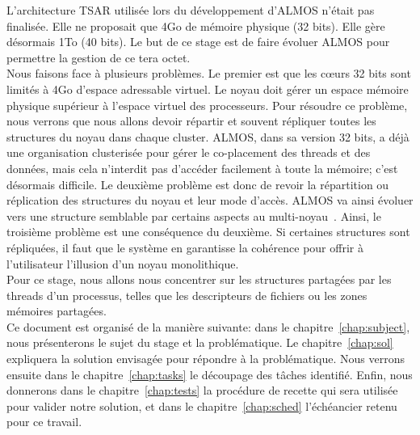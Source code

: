   \hspace{1cm}L'architecture TSAR utilisée lors du développement d'ALMOS n'était
  pas finalisée. Elle ne proposait que 4Go de mémoire physique (32 bits). Elle
  gère désormais 1To (40 bits). Le but de ce stage est de faire évoluer ALMOS
  pour permettre la gestion de ce tera octet.\\

  \hspace{1cm}Nous faisons face à plusieurs problèmes. Le premier est que les
  c\oe urs 32 bits sont limités à 4Go d'espace adressable virtuel. Le noyau doit
  gérer un espace mémoire physique supérieur à l'espace virtuel des
  processeurs. Pour résoudre ce problème, nous verrons que nous allons devoir
  répartir et souvent répliquer toutes les structures du noyau dans chaque
  cluster. ALMOS, dans sa version 32 bits, a déjà une organisation clusterisée
  pour gérer le co-placement des threads et des données, mais cela n'interdit
  pas d'accéder facilement à toute la mémoire; c'est désormais difficile. Le
  deuxième problème est donc de revoir la répartition ou réplication des
  structures du noyau et leur mode d'accès. ALMOS va ainsi évoluer vers une
  structure semblable par certains aspects au
  multi-noyau~\citep{baumann2009multikernel}. Ainsi, le troisième problème est
  une conséquence du deuxième. Si certaines structures sont répliquées, il faut
  que le système en garantisse la cohérence pour offrir à l'utilisateur
  l'illusion d'un noyau monolithique. \\

  \hspace{1cm}Pour ce stage, nous allons nous concentrer sur les structures
  partagées par les threads d'un processus, telles que les descripteurs de
  fichiers ou les zones mémoires partagées. \\


  \hspace{1cm}Ce document est organisé de la manière suivante: dans le
  chapitre~\ref{chap:subject}, nous présenterons le sujet du stage et la
  problématique. Le chapitre~\ref{chap:sol} expliquera la solution envisagée
  pour répondre à la problématique. Nous verrons ensuite dans le
  chapitre~\ref{chap:tasks} le découpage des tâches identifié. Enfin, nous
  donnerons dans le chapitre~\ref{chap:tests} la procédure de recette qui sera
  utilisée pour valider notre solution, et dans le chapitre~\ref{chap:sched}
  l'échéancier retenu pour ce travail.
